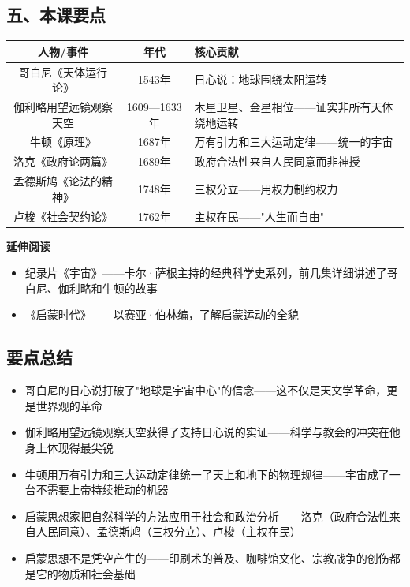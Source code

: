 \documentclass[a4paper,12pt]{ctexart}
\begin{document}
\subsection*{五、本课要点}

\begin{center}
\begin{tabular}{|c|c|p{7cm}|}
\hline
\textbf{人物/事件} & \textbf{年代} & \textbf{核心贡献} \\
\hline
哥白尼《天体运行论》 & 1543年 & 日心说：地球围绕太阳运转 \\
\hline
伽利略用望远镜观察天空 & 1609—1633年 & 木星卫星、金星相位——证实非所有天体绕地运转 \\
\hline
牛顿《原理》 & 1687年 & 万有引力和三大运动定律——统一的宇宙 \\
\hline
洛克《政府论两篇》 & 1689年 & 政府合法性来自人民同意而非神授 \\
\hline
孟德斯鸠《论法的精神》 & 1748年 & 三权分立——用权力制约权力 \\
\hline
卢梭《社会契约论》 & 1762年 & 主权在民——"人生而自由" \\
\hline
\end{tabular}
\end{center}

\vspace{0.3cm}
\textcolor{blue!70!black}{\textbf{延伸阅读}}
\begin{itemize}
  \item 纪录片《宇宙》——卡尔·萨根主持的经典科学史系列，前几集详细讲述了哥白尼、伽利略和牛顿的故事
  \item 《启蒙时代》——以赛亚·伯林编，了解启蒙运动的全貌
\end{itemize}

\subsection*{要点总结}
\begin{itemize}
  \item 哥白尼的日心说打破了"地球是宇宙中心"的信念——这不仅是天文学革命，更是世界观的革命
  \item 伽利略用望远镜观察天空获得了支持日心说的实证——科学与教会的冲突在他身上体现得最尖锐
  \item 牛顿用万有引力和三大运动定律统一了天上和地下的物理规律——宇宙成了一台不需要上帝持续推动的机器
  \item 启蒙思想家把自然科学的方法应用于社会和政治分析——洛克（政府合法性来自人民同意）、孟德斯鸠（三权分立）、卢梭（主权在民）
  \item 启蒙思想不是凭空产生的——印刷术的普及、咖啡馆文化、宗教战争的创伤都是它的物质和社会基础
\end{itemize}
\end{document}
